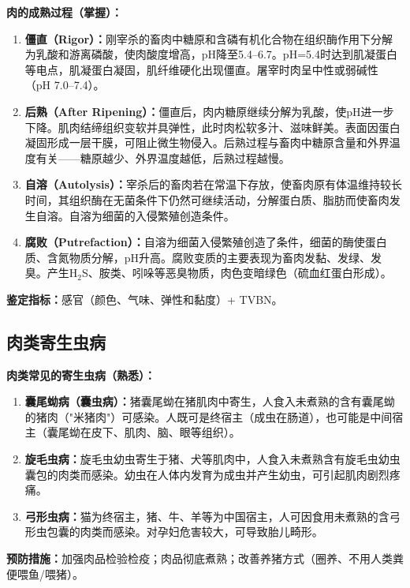 \begin{keybox}
\difficulty \textbf{肉的成熟过程（掌握）：}

\begin{enumerate}[leftmargin=*]
    \item \textbf{僵直（Rigor）：}刚宰杀的畜肉中糖原和含磷有机化合物在组织酶作用下分解为乳酸和游离磷酸，使肉酸度增高，pH降至5.4--6.7。pH=5.4时达到肌凝蛋白等电点，肌凝蛋白凝固，肌纤维硬化出现僵直。屠宰时肉呈中性或弱碱性（pH 7.0--7.4）。
    \item \textbf{后熟（After Ripening）：}僵直后，肉内糖原继续分解为乳酸，使pH进一步下降。肌肉结缔组织变软并具弹性，此时肉松软多汁、滋味鲜美。表面因蛋白凝固形成一层干膜，可阻止微生物侵入。后熟过程与畜肉中糖原含量和外界温度有关——糖原越少、外界温度越低，后熟过程越慢。
    \item \textbf{自溶（Autolysis）：}宰杀后的畜肉若在常温下存放，使畜肉原有体温维持较长时间，其组织酶在无菌条件下仍然可继续活动，分解蛋白质、脂肪而使畜肉发生自溶。自溶为细菌的入侵繁殖创造条件。
    \item \textbf{腐败（Putrefaction）：}自溶为细菌入侵繁殖创造了条件，细菌的酶使蛋白质、含氮物质分解，pH升高。腐败变质的主要表现为畜肉发黏、发绿、发臭。产生H$_2$S、胺类、吲哚等恶臭物质，肉色变暗绿色（硫血红蛋白形成）。
\end{enumerate}

\textbf{鉴定指标：}感官（颜色、气味、弹性和黏度）+ TVBN。
\end{keybox}

\subsection{肉类寄生虫病}

\begin{tipbox}
\textbf{肉类常见的寄生虫病（熟悉）：}
\begin{enumerate}[leftmargin=*]
    \item \textbf{囊尾蚴病（囊虫病）：}猪囊尾蚴在猪肌肉中寄生，人食入未煮熟的含有囊尾蚴的猪肉（"米猪肉"）可感染。人既可是终宿主（成虫在肠道），也可能是中间宿主（囊尾蚴在皮下、肌肉、脑、眼等组织）。
    \item \textbf{旋毛虫病：}旋毛虫幼虫寄生于猪、犬等肌肉中，人食入未煮熟含有旋毛虫幼虫囊包的肉类而感染。幼虫在人体内发育为成虫并产生幼虫，可引起肌肉剧烈疼痛。
    \item \textbf{弓形虫病：}猫为终宿主，猪、牛、羊等为中国宿主，人可因食用未煮熟的含弓形虫包囊的肉类而感染。对孕妇危害较大，可导致胎儿畸形。
\end{enumerate}

\textbf{预防措施：}加强肉品检验检疫；肉品彻底煮熟；改善养猪方式（圈养、不用人类粪便喂鱼/喂猪）。
\end{tipbox}

